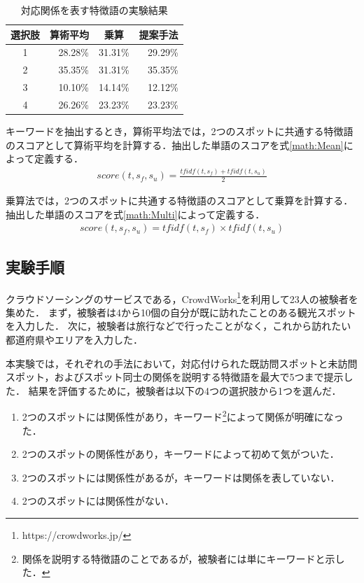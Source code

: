 \documentclass[submit]{ipsj}
\begin{document}
\begin{table}[t]
  \caption{対応関係を表す特徴語の実験結果}
  \label{table:対応関係を表す特徴語の実験結果}
  \centering
  \begin{tabular}{c|r|r|r}
  \hline \hline
  選択肢 & \multicolumn{1}{c|}{算術平均} & \multicolumn{1}{c|}{乗算} & \multicolumn{1}{c}{提案手法} \\ \hline
  1  & 28.28\%                  & 31.31\%                  & 29.29\%                 \\
  2  & 35.35\%                  & 31.31\%                  & 35.35\%                 \\
  3  & 10.10\%                   & 14.14\%                  & 12.12\%                 \\
  4  & 26.26\%                  & 23.23\%                  & 23.23\%                 \\ \hline
  \end{tabular}
\end{table}

キーワードを抽出するとき，算術平均法では，2つのスポットに共通する特徴語のスコアとして算術平均を計算する．抽出した単語のスコアを式\ref{math:Mean}によって定義する．
\begin{eqnarray}
  score(t,s_f,s_u) = \frac{tfidf(t,s_f) + tfidf(t,s_u)}{2}
  \label{math:Mean}
\end{eqnarray}

乗算法では，2つのスポットに共通する特徴語のスコアとして乗算を計算する．抽出した単語のスコアを式\ref{math:Multi}によって定義する．
\begin{eqnarray}
  score(t,s_f,s_u) = tfidf(t,s_f) \times tfidf(t,s_u)
  \label{math:Multi}
\end{eqnarray}

\subsection{実験手順}
\label{subsec:実験手順}
クラウドソーシングのサービスである，CrowdWorks\footnote{https://crowdworks.jp/}を利用して23人の被験者を集めた．
まず，被験者は4から10個の自分が既に訪れたことのある観光スポットを入力した．
次に，被験者は旅行などで行ったことがなく，これから訪れたい都道府県やエリアを入力した．

本実験では，それぞれの手法において，対応付けられた既訪問スポットと未訪問スポット，およびスポット同士の関係を説明する特徴語を最大で5つまで提示した．
結果を評価するために，被験者は以下の4つの選択肢から1つを選んだ．
\begin{enumerate}
  \item 2つのスポットには関係性があり，キーワード\footnote{関係を説明する特徴語のことであるが，被験者には単にキーワードと示した．}によって関係が明確になった．
  \item 2つのスポットの関係性があり，キーワードによって初めて気がついた．
  \item 2つのスポットには関係性があるが，キーワードは関係を表していない．
  \item 2つのスポットには関係性がない．
\end{enumerate}
\end{document}
